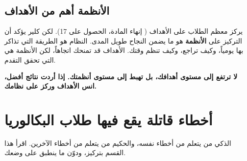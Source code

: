 \documentclass[12pt,a4paper]{book}
\newcommand{\importantAr}[1]{%
	\begin{important}
		\bfseries #1
	\end{important}
}
\begin{document}
	\subsection{الأنظمة أهم من الأهداف}
\label{sec:systems-over-goals}
	يركز معظم الطلاب على الأهداف ( إنهاء المادة، الحصول على 17). لكن كلير يؤكد أن التركيز على \textbf{الأنظمة} هو ما يضمن النجاح طويل المدى. النظام هو الطريقة التي تذاكر بها يومياً، وكيف تراجع، وكيف تنظم وقتك. الأهداف قد تمنحك اتجاهاً، لكن الأنظمة هي التي تحقق التقدم.
	
	\importantAr{
		لا ترتفع إلى مستوى أهدافك، بل تهبط إلى مستوى أنظمتك. إذا أردت نتائج أفضل، انس الأهداف وركز على نظامك.
	}
	
	
	\section{أخطاء قاتلة يقع فيها طلاب البكالوريا}
	\label{sec:owner-experiences4}
	
	الذكي من يتعلم من أخطاء نفسه، والحكيم من يتعلم من أخطاء الآخرين. اقرأ هذا القسم بتركيز، ودوّن ما ينطبق على وضعك.
	
\end{document}
